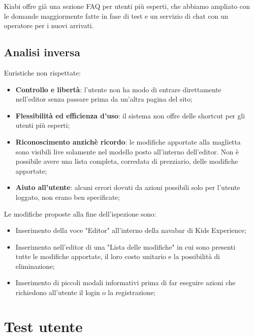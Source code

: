 \documentclass[12pt,italian,]{report}
\begin{document}
Kiabi offre già una sezione FAQ per utenti più esperti, che abbiamo ampliato con le domande maggiormente fatte in fase di test e un servizio di chat con un operatore per i nuovi arrivati.

\subsection{Analisi inversa} 

Euristiche non rispettate:

\begin{itemize}
\item \textbf{Controllo e libertà}: l'utente non ha modo di entrare direttamente nell'editor senza passare prima da un'altra pagina del sito;

\item \textbf{Flessibilità ed efficienza d'uso}: il sistema non offre delle shortcut per gli utenti più esperti;

\item \textbf{Riconoscimento anzichè ricordo}: le modifiche apportate alla maglietta sono visibili live solamente nel modello posto all'interno dell'editor. Non è possibile avere una lista completa, corredata di prezziario, delle modifiche apportate;

\item \textbf{Aiuto all'utente}: alcuni errori dovuti da azioni possibili solo per l'utente loggato, non erano ben specificate;
\end{itemize}

Le modifiche proposte alla fine dell'ispezione sono:
\begin{itemize}
\item Inserimento della voce "Editor" all'interno della navabar di Kids Experience;
\item Inserimento nell'editor di una "Lista delle modifiche" in cui sono presenti tutte le modifiche apportate, il loro costo unitario e la possibilità di eliminazione;
\item Inserimento di piccoli modali informativi prima di far eseguire azioni che richiedono all'utente il login o la registrazione; 
\end{itemize}



\hypertarget{test-utente}{%
\section{Test utente}\label{test-utente}}
\end{document}
